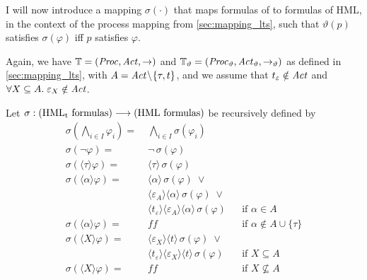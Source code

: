 %
\begin{isabellebody}%
%
%
\isadelimtheory
%
\endisadelimtheory
%
\isatagtheory
%
\endisatagtheory
{\isafoldtheory}%
%
\isadelimtheory
%
\endisadelimtheory
%
\isadelimdocument
%
\endisadelimdocument
%
\isatagdocument
%
\isamarkuptrue%
%
\endisatagdocument
{\isafolddocument}%
%
\isadelimdocument
%
\endisadelimdocument
%
\begin{isamarkuptext}%
\label{sec:mapping_formulas}%
\end{isamarkuptext}\isamarkuptrue%
%
\begin{isamarkuptext}%
I will now introduce a mapping $\sigma(\cdot)$ that maps formulas of \HMLt{} to formulas of HML, in the context of the process mapping from \cref{sec:mapping_lts}, such that $\vartheta(p)$ satisfies $\sigma(\varphi)$ iff $p$ satisfies $\varphi$.

Again, we have $\mathbb{T} = (\mathit{Proc}, \mathit{Act}, \rightarrow)$ and $\mathbb{T}_\vartheta = (\mathit{Proc}_\vartheta, \mathit{Act}_\vartheta, \rightarrow_\vartheta)$ as defined in \cref{sec:mapping_lts}, with $A = \mathit{Act} \!\setminus\! \{\tau, t\}$, and we assume that $t_\varepsilon \notin \mathit{Act}$ and $\forall X \subseteq A.\; \varepsilon_X \notin \mathit{Act}$.

Let $\sigma : (\text{HML\textsubscript{t}{} formulas}) \longrightarrow (\text{HML formulas})$ be recursively defined by
\begin{align*}
    \sigma(\textstyle\bigwedge_{i \in I} \varphi_i) =\;& \textstyle\bigwedge_{i \in I} \sigma(\varphi_i) &\\
    \sigma(\neg\varphi) =\;& \neg\,\sigma(\varphi)\\
    \sigma(\langle\tau\rangle\varphi) =\;& \langle\tau\rangle\,\sigma(\varphi)\\
    \sigma(\langle\alpha\rangle\varphi) =\;& 
        \langle\alpha\rangle\,\sigma(\varphi)\;\vee\\
        &\langle\varepsilon_A\rangle\langle\alpha\rangle\,\sigma(\varphi)\;\vee\\ 
        &\langle{}t_\varepsilon\rangle\langle\varepsilon_A\rangle\langle\alpha\rangle\,\sigma(\varphi) && \text{if $\alpha \in A$}\\
    \sigma(\langle\alpha\rangle\varphi) =\;& f\!\!f && \text{if $\alpha \notin A \cup \{\tau\}$}\\
    \sigma(\langle{}X\rangle\varphi) =\;&
        \langle\varepsilon_X\rangle\langle{}t\rangle\,\sigma(\varphi)\;\vee\\
        &\langle{}t_\varepsilon\rangle\langle\varepsilon_X\rangle\langle{}t\rangle\,\sigma(\varphi) && \text{if $X \subseteq A$} \\
    \sigma(\langle{}X\rangle\varphi) =\;& f\!\!f && \text{if $X \not\subseteq A$}
\end{align*}


\end{isamarkuptext}
\end{isabellebody}
